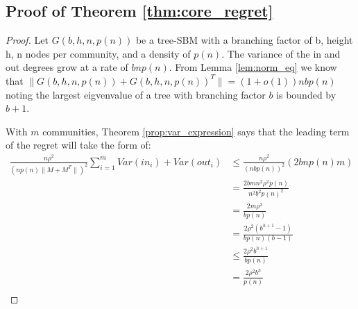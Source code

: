 \subsection{Proof of Theorem \ref{thm:core_regret}}\label{proof:core_regret}
\begin{proof}
Let $G(b,h, n, p(n))$ be a tree-SBM with a branching factor of b, height h, n nodes per community, and a density of $p(n)$.  The variance of the in and out degrees grow at a rate of $b n p(n)$. From Lemma \ref{lem:norm_eq} we know that $\| G(b,h,n,p(n)) + G(b,h,n,p(n))^T\| = (1+o(1)) n b p(n) $ noting the largest eigvenvalue of a tree with branching factor $b$ is bounded by $b+1$. 

With $m$ communities, Theorem \ref{prop:var_expression} says that the leading term of the regret will take the form of:
\begin{align*}
     \frac{ n \rho^2}{ (n p(n) \|M+M^T\|)^2 } \sum_{i =1 }^{m} Var( in_i ) + Var(out_i) &\leq   \frac{ n \rho^2}{ (n b p(n) )^2 } \left(2 b  n p(n) m \right) \\
     &= \frac{2 b m n^2 \rho^2  p(n)}{n^2 b^2 p(n)^2} \\
     &= \frac{2 m \rho^2  }{b p(n)}\\
     &= \frac{2 \rho^2 (b^{h+1} -1)}{ b p(n) (b-1)}\\
     &\leq \frac{2 \rho^2 b^{h+1}}{ b p(n)}\\
     &= \frac{2 \rho^2 b^{h}}{ p(n)}\\
\end{align*}
\end{proof}



